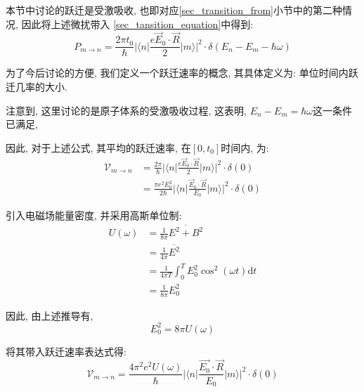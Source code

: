 \documentclass[a4paper, 11pt]{article}
\begin{document}
\begin{spacing}{1.2}
          本节中讨论的跃迁是受激吸收, 也即对应\ref{sec_transition_from}小节中的第二种情况, 因此将上述微扰带入
          \eqref{sec_tansition_equation}中得到:     
          \begin{equation}
            P_{m\to{}n} = \frac{2\pi{}t_0}{\hbar}|\langle{}n|\frac{e\vec{E}_0\cdot\vec{R}}{2}|m\rangle|^2
            \cdot\delta(E_n-E_m-\hbar\omega)
          \end{equation}

          为了今后讨论的方便, 我们定义一个跃迁速率的概念, 其具体定义为: 单位时间内跃迁几率的大小.

          注意到, 这里讨论的是原子体系的受激吸收过程, 这表明, $E_n-E_m = \hbar\omega$这一条件已满足,   
        
          因此, 对于上述公式, 其平均的跃迁速率, 在$[0, t_0]$时间内, 为:
          \begin{equation}
            \begin{aligned}
              \mathcal{V}_{m\to{}n} &= \frac{2\pi}{\hbar}|\langle{}n|\frac{e\vec{E}_0\cdot\vec{R}}{2}|m\rangle|
                                        ^2\cdot\delta(0)\\
                                    &= \frac{\pi{}e^2E_0^2}{2\hbar}|\langle{}n|\frac{\vec{E}_0\cdot\vec{R}}{E_0}%
                                       |m\rangle|^2\cdot\delta(0)
            \end{aligned}
          \end{equation}

          引入电磁场能量密度, 并采用高斯单位制:  
          \begin{equation}
            \begin{aligned}
              U(\omega) &= \frac{1}{8\pi}\overline{E^2+B^2}\\ 
                        &= \frac{1}{4\pi}\overline{E^2} \\
                        &= \frac{1}{4\pi{}T}\int_0^TE_0^2\cos^2(\omega{}t)\mathrm{d}t\\
                        &= \frac{1}{8\pi}E_0^2
            \end{aligned}
          \end{equation}

          因此, 由上述推导有, 
          \begin{equation}
            E_0^2 = 8\pi{}U(\omega)
          \end{equation}

          将其带入跃迁速率表达式得:
          \begin{equation}
            \mathcal{V}_{m\to{}n} = \frac{4\pi^2e^2U(\omega)}{\hbar}
                                    |\langle{}n|\frac{\vec{E_0}\cdot\vec{R}}{E_0}|m\rangle|^2
                                    \cdot\delta(0)
          \end{equation}


\end{spacing}
\end{document}
